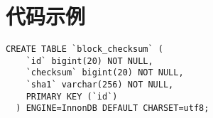 \chapter{代码示例}

\begin{lstlisting}[style=swustsql]
  CREATE TABLE `block_checksum` (
  	`id` bigint(20) NOT NULL,
  	`checksum` bigint(20) NOT NULL,
  	`sha1` varchar(256) NOT NULL,
	PRIMARY KEY (`id`)
  ) ENGINE=InnonDB DEFAULT CHARSET=utf8;
\end{lstlisting}
